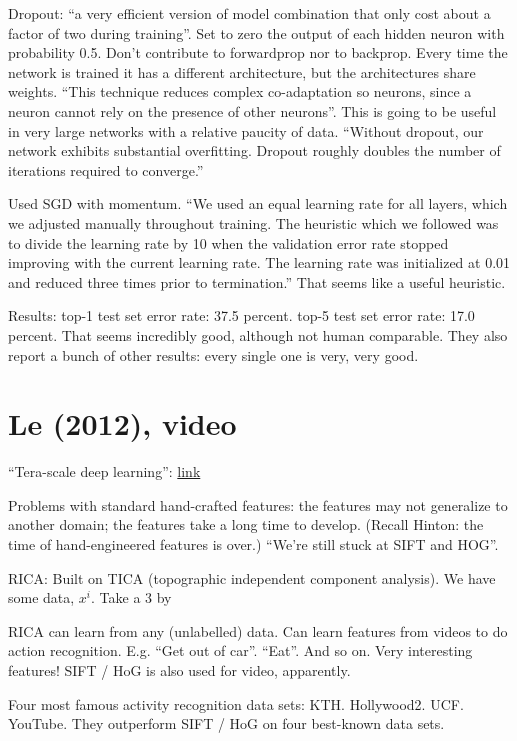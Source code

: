 \documentclass[12pt]{report}
\newcommand{\link}[2]{\href{#1}{#2}}
\begin{document}
Dropout: ``a very efficient version of model combination that only
cost about a factor of two during training''.  Set to zero the output
of each hidden neuron with probability 0.5.  Don't contribute to
forwardprop nor to backprop.  Every time the network is trained it has
a different architecture, but the architectures share weights.  ``This
technique reduces complex co-adaptation so neurons, since a neuron
cannot rely on the presence of other neurons''.  This is going to be
useful in very large networks with a relative paucity of data.
``Without dropout, our network exhibits substantial overfitting.
Dropout roughly doubles the number of iterations required to
converge.''

Used SGD with momentum.  ``We used an equal learning rate for all
layers, which we adjusted manually throughout training.  The heuristic
which we followed was to divide the learning rate by 10 when the
validation error rate stopped improving with the current learning
rate.  The learning rate was initialized at 0.01 and reduced three
times prior to termination.''   That seems like a useful heuristic.

Results: top-1 test set error rate: 37.5 percent.  top-5 test set
error rate: 17.0 percent.  That seems incredibly good, although not
human comparable.  They also report a bunch of other results: every
single one is very, very good.

\section{Le (2012), video}

``Tera-scale deep learning'': \link{http://vimeo.com/52332329}{link}

Problems with standard hand-crafted features: the features may not
generalize to another domain; the features take a long time to
develop.  (Recall Hinton: the time of hand-engineered features is
over.)  ``We're still stuck at SIFT and HOG''.  

RICA: Built on TICA (topographic independent component analysis).  We
have some data, $x^i$.  Take a 3 by 

RICA can learn from any (unlabelled) data.  Can learn features from
videos to do action recognition.  E.g. ``Get out of car''.  ``Eat''.
And so on.  Very interesting features!  SIFT / HoG is also used for
video, apparently.

Four most famous activity recognition data sets: KTH.
Hollywood2. UCF. YouTube.  They outperform SIFT / HoG on four
best-known data sets.
\end{document}
